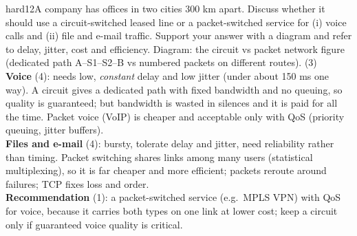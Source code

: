 \documentclass[10pt]{article}
\begin{document}
\begin{practice}{hard}{12}A company has offices in two cities 300 km apart. Discuss whether it should use a circuit-switched leased line or a packet-switched service for (i) voice calls and (ii) file and e-mail traffic. Support your answer with a diagram and refer to delay, jitter, cost and efficiency.
\sol
Diagram: the circuit vs packet network figure (dedicated path A--S1--S2--B vs numbered packets on different routes). (3)\\
\textbf{Voice} (4): needs low, \emph{constant} delay and low jitter (under about 150 ms one way). A circuit gives a dedicated path with fixed bandwidth and no queuing, so quality is guaranteed; but bandwidth is wasted in silences and it is paid for all the time. Packet voice (VoIP) is cheaper and acceptable only with QoS (priority queuing, jitter buffers).\\
\textbf{Files and e-mail} (4): bursty, tolerate delay and jitter, need reliability rather than timing. Packet switching shares links among many users (statistical multiplexing), so it is far cheaper and more efficient; packets reroute around failures; TCP fixes loss and order.\\
\textbf{Recommendation} (1): a packet-switched service (e.g.\ MPLS VPN) with QoS for voice, because it carries both types on one link at lower cost; keep a circuit only if guaranteed voice quality is critical.
\end{practice}
\end{document}
